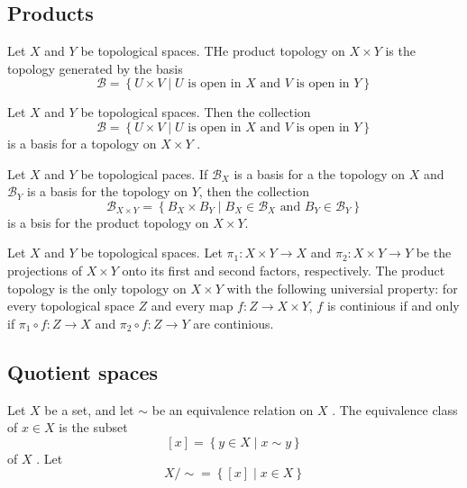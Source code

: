 \documentclass{article}
\theoremstyle{remark}
\begin{document}
\subsection{Products}%
\label{sub:products}

\begin{definition}
    Let $X$  and $Y $  be topological spaces. THe product topology on $X \times Y$  is the topology generated by the
    basis \[
        \mathscr{B}  = \left\{ U \times V  \mid  U \text{ is open in } X \text{ and } V \text{ is open in } Y  \right\}
    \]
\end{definition}

\begin{lemma}
    Let $X$ and $Y$  be topological spaces. Then the collection \[
        \mathscr{B }  = \left\{ U \times  V  \mid  U \text{ is open in } X \text{ and } V \text{ is open in }Y \right\}
    \]
    is a basis for a topology on $ X \times Y $ .
\end{lemma}


\begin{theorem}
 Let $X$  and $Y$  be topological paces. If $\mathscr{B} _{X}$  is a basis for a the topology on $X$  and $\mathscr{B}
 _{Y}$  is a basis for the topology on $Y$, then the collection \[
 \mathscr{B} _{X \times Y} = \left\{ B_{X} \times B_{Y}  \mid  B_{X} \in  \mathscr{B} _{X} \text{ and } B_{Y} \in
 \mathscr{B} _{Y} \right\}
 \]
 is a bsis for the product topology on $X  \times  Y$.
\end{theorem}


\begin{theorem}
    Let $X$  and $Y$ be topological spaces. Let $\pi _{1}: X \times Y \to X$  and $\pi _{2} : X \times Y \to Y$ be the
    projections of $X \times Y$  onto its first and second factors, respectively. The product topology is the only
    topology on $X \times  Y$ with  the following universial property: for every topological space $Z$  and every map
    $f: Z  \to X \times Y$, $f $  is continious if and only if $\pi _{1} \circ f : Z \to X $ and $\pi _{2} \circ f: Z
    \to Y$ are continious.
\end{theorem}


\subsection{Quotient spaces}%
\label{sub:quotient_spaces}

\begin{definition}
    Let $X$  be a set, and let $\sim $  be an equivalence relation on $X$ . The equivalence class of $x \in X$  is the
    subset \[
        \left[ x \right]= \left\{ y \in  X   \mid  x \sim y\right\}
    \]
    of $X$ . Let \[
        X / \sim = \left\{ \left[ x \right]  \mid  x \in  X \right\}
    \]

\end{definition}
\end{document}
